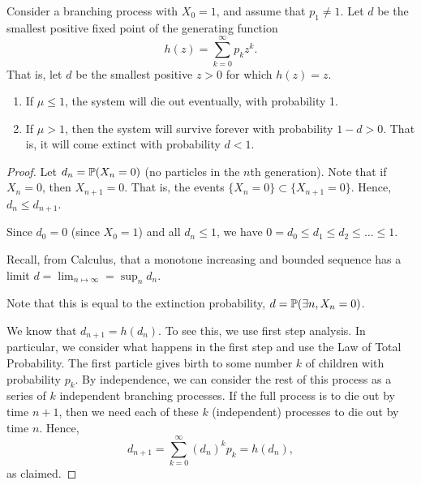 \documentclass[letterpaper]{article}
\begin{document}
\begin{theorem}{}{}
    Consider a branching process with $X_0 = 1$, and assume that $p_1 \neq 1$. Let $d$ be the smallest positive fixed point of the generating function \[h(z) = \sum_{k = 0}^{\infty} p_k z^k.\] That is, let $d$ be the smallest positive $z > 0$ for which $h(z) = z$.
    \begin{enumerate}
        \item If $\mu \leq 1$, the system will die out eventually, with probability 1.
        \item If $\mu > 1$, then the system will survive forever with probability $1 - d > 0$. That is, it will come extinct with probability $d < 1$.
    \end{enumerate}
\end{theorem}
\begin{mdframed}[]
    \begin{proof}
        Let $d_n = \mathbb{P}(X_n = 0)$ (no particles in the $n$th generation). Note that if $X_n = 0$, then $X_{n + 1} = 0$. That is, the events $\{X_n = 0\} \subset \{X_{n + 1} = 0\}$. Hence, $d_n \leq d_{n + 1}$. 

        \bigskip 

        Since $d_0 = 0$ (since $X_0 = 1$) and all $d_n \leq 1$, we have $0 = d_0 \leq d_1 \leq d_2 \leq \dots \leq 1$. 

        \bigskip 

        Recall, from Calculus, that a monotone increasing and bounded sequence has a limit $d = \lim_{n \mapsto \infty} = \sup_{n} d_n$.

        \bigskip 

        Note that this is equal to the extinction probability, $d = \mathbb{P}(\exists n, X_n = 0)$.

        \bigskip 

        We know that $d_{n + 1} = h(d_n)$. To see this, we use first step analysis. In particular, we consider what happens in the first step and use the Law of Total Probability. The first particle gives birth to some number $k$ of children with probability $p_k$. By independence, we can consider the rest of this process as a series of $k$ independent branching processes. If the full process is to die out by time $n + 1$, then we need each of these $k$ (independent) processes to die out by time $n$. Hence,
        \[d_{n + 1} = \sum_{k = 0}^{\infty} (d_n)^k p_k = h(d_n),\]
        as claimed.

        \bigskip 
        

\end{proof}
\end{mdframed}
\end{document}
